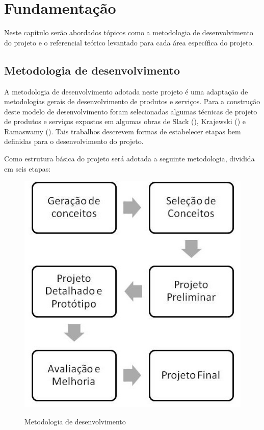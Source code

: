 \chapter[Fundamentação]{Fundamentação}
  
  Neste capítulo serão abordados tópicos como a metodologia de desenvolvimento do projeto e o referencial teórico levantado
  para cada área específica do projeto.
  
  \section{Metodologia de desenvolvimento}
  
  A metodologia de desenvolvimento adotada neste projeto é uma adaptação de metodologias gerais de desenvolvimento de
  produtos e serviços. Para a construção deste modelo de desenvolvimento foram selecionadas algumas técnicas de projeto
  de produtos e serviços expostos em algumas obras de Slack (\citeyear{slack99}), Krajewski (\citeyear{krajewski96}) e
  Ramaswamy (\citeyear{ramaswamy96}). Tais trabalhos descrevem formas de estabelecer etapas bem definidas para o desenvolvimento do projeto.
  
  Como estrutura básica do projeto será adotada a seguinte metodologia, dividida em seis etapas:
  
  \begin{figure}[h]
  \begin{center}

  \includegraphics[scale=0.3]{editaveis/figuras/metodologia_de_desenvolvimento}
  \label{Metodologia de desenvolvimento}
  \caption{Metodologia de desenvolvimento}
  \end{center}
  \end{figure}
  \FloatBarrier
  
